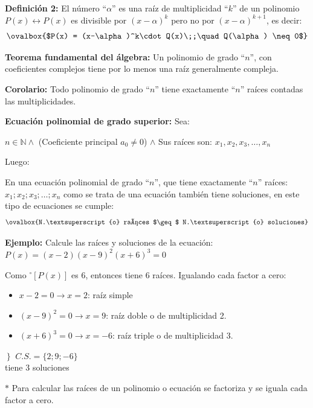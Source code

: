 \documentclass[11pt,a4paper]{article}
\begin{document}
\textbf{Definición 2:} El número ``$\alpha$'' es una raíz de multiplicidad ``$k$'' de un
polinomio $P(x) \longleftrightarrow P(x)$ es divisible por $(x-\alpha)^k$ pero no por
$(x-\alpha)^{k+1}$, es decir:
\[\ovalbox{$P(x) = (x-\alpha)^k\cdot Q(x)\;;\quad Q(\alpha) \neq 0$}\]

\textbf{Teorema fundamental del álgebra:} Un polinomio de grado ``$n$'', con coeficientes
complejos tiene por lo menos una raíz generalmente compleja.

\textbf{Corolario:} Todo polinomio de grado ``$n$'' tiene exactamente ``$n$'' raíces
contadas las multiplicidades.

\textbf{Ecuación polinomial de grado superior:} Sea:
\ 

$n \in \mathbb{N} \wedge$ (Coeficiente principal $a_0 \neq 0$) $\wedge$ Sus raíces son:
$x_1, x_2, x_3, \ldots, x_n$

Luego: \quad {}

En una ecuación polinomial de grado ``$n$'', que tiene exactamente ``$n$'' raíces:
$x_1; x_2; x_3; \ldots; x_n$ como se trata de una ecuación también tiene soluciones, en este
tipo de ecuaciones se cumple:
\[\ovalbox{N.\textsuperscript{o} raíces $\geq$ N.\textsuperscript{o} soluciones}\]

\textbf{Ejemplo:} Calcule las raíces y soluciones de la ecuación:
\ $P(x) = (x-2)(x-9)^2(x+6)^3 = 0$

Como $^{\circ}[P(x)]$ es 6, entonces tiene 6 raíces. Igualando cada factor a cero:

\begin{minipage}{0.630\textwidth}
\begin{itemize}
  \item $x - 2 = 0 \rightarrow x = 2$: raíz simple
  \item $(x-9)^2 = 0 \rightarrow x = 9$: raíz doble o de multiplicidad 2.
  \item $(x+6)^3 = 0 \rightarrow x = -6$: raíz triple o de multiplicidad 3.
\end{itemize}
\end{minipage}\hfill
\begin{minipage}{0.339\textwidth}
$\left.\right\}$ $C.S. = \{2; 9; -6\}$ \\ tiene 3 soluciones

\smallskip
{\small $\ast$ Para calcular las raíces de un polinomio o ecuación se factoriza y se iguala
cada factor a cero.}
\end{minipage}
\end{document}
